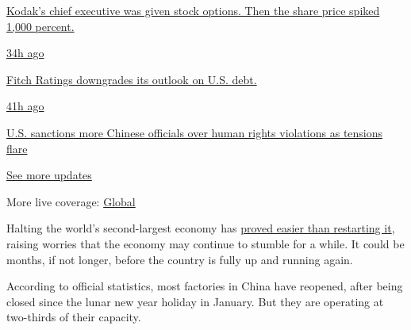 \href{https://www.nytimes.com/live/2020/07/31/business/stock-market-today-coronavirus?action=click\&pgtype=Article\&state=default\&region=MAIN_CONTENT_1\&context=storylines_live_updates\#kodaks-chief-executive-was-given-stock-options-then-the-share-price-spiked-1000-percent}{Kodak's
chief executive was given stock options. Then the share price spiked
1,000 percent.}

\href{https://www.nytimes.com/live/2020/07/31/business/stock-market-today-coronavirus?action=click\&pgtype=Article\&state=default\&region=MAIN_CONTENT_1\&context=storylines_live_updates\#fitch-ratings-downgrades-its-outlook-on-us-debt}{34h
ago}

\href{https://www.nytimes.com/live/2020/07/31/business/stock-market-today-coronavirus?action=click\&pgtype=Article\&state=default\&region=MAIN_CONTENT_1\&context=storylines_live_updates\#fitch-ratings-downgrades-its-outlook-on-us-debt}{Fitch
Ratings downgrades its outlook on U.S. debt.}

\href{https://www.nytimes.com/live/2020/07/31/business/stock-market-today-coronavirus?action=click\&pgtype=Article\&state=default\&region=MAIN_CONTENT_1\&context=storylines_live_updates\#us-sanctions-more-chinese-officials-over-human-rights-violations-as-tensions-flare}{41h
ago}

\href{https://www.nytimes.com/live/2020/07/31/business/stock-market-today-coronavirus?action=click\&pgtype=Article\&state=default\&region=MAIN_CONTENT_1\&context=storylines_live_updates\#us-sanctions-more-chinese-officials-over-human-rights-violations-as-tensions-flare}{U.S.
sanctions more Chinese officials over human rights violations as
tensions flare}

\href{https://www.nytimes.com/live/2020/07/31/business/stock-market-today-coronavirus?action=click\&pgtype=Article\&state=default\&region=MAIN_CONTENT_1\&context=storylines_live_updates}{See
more updates}

More live coverage:
\href{https://www.nytimes.com/2020/08/01/world/coronavirus-covid-19.html?action=click\&pgtype=Article\&state=default\&region=MAIN_CONTENT_1\&context=storylines_live_updates}{Global}

Halting the world's second-largest economy has
\href{https://www.nytimes.com/2020/03/12/business/china-coronavirus-economy.html}{proved
easier than restarting it}, raising worries that the economy may
continue to stumble for a while. It could be months, if not longer,
before the country is fully up and running again.

According to official statistics, most factories in China have reopened,
after being closed since the lunar new year holiday in January. But they
are operating at two-thirds of their capacity.

